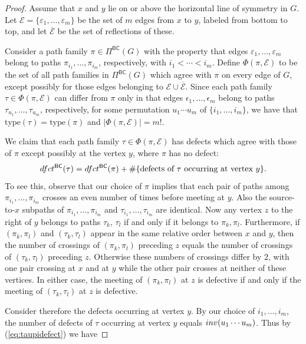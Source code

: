 \documentclass[10pt,a4paper]{amsart}
\newcommand{\PiBC}{\Pi^{\msfBC}}
\newcommand{\dfct}{\textsc{dfct}}
\newcommand{\inv}{\textsc{inv}}
\newcommand{\msfBC}{\mathsf{BC}}
\newcommand{\ol}[1]{\overline{#1}}
\newcommand{\type}{\mathrm{type}}
\begin{document}
\begin{proof}
Assume that $x$ and $y$ lie on or above the horizontal line of symmetry in $G$. Let $\mathcal E = \{\varepsilon_1,\dotsc, \varepsilon_m\}$ be the set of $m$ edges from $x$ to $y$, labeled from bottom to top, and let $\ol{\mathcal E}$ be the set of reflections of these.  

Consider a path family $\pi \in \PiBC(G)$ with the property that
edges $\varepsilon_1,\dotsc,\varepsilon_m$ belong to
paths $\pi_{i_1},\dotsc,\pi_{i_m}$, 
respectively, with $i_1 < \cdots < i_m$.
Define 
$\Phi(\pi,\mathcal E)$ to be the set of all path families in $\PiBC(G)$ which agree with $\pi$ on every edge of $G$, except possibly for those edges belonging to $\mathcal E \cup \ol{\mathcal E}$.
Since each path family $\tau \in \Phi(\pi,\mathcal E)$ 
can differ from $\pi$
only in that 
edges $\epsilon_1,\dotsc,\epsilon_m$ belong to 
paths $\tau_{u_1},\dotsc,\tau_{u_m}$, respectively,
for some permutation $u_1 \cdots u_m$ of $\{i_1,\dotsc,i_m\}$, we have that
$\type(\tau) = \type(\pi)$ and 
$|\Phi(\pi,\mathcal E)| = m!$.
  

We claim that each path family $\tau \in \Phi(\pi,\mathcal E)$ has defects which agree with those of $\pi$ except possibly at the vertex $y$, where $\pi$ has no defect:
   \begin{equation}\label{eq:taupidefect}
    \dfct^{\msfBC}(\tau) = \dfct^{\msfBC}(\pi) + \# \{ \text{defects of $\tau$ occurring at vertex $y$}\}.
\end{equation}
To see this, observe that our choice of $\pi$ implies that each pair of paths among $\pi_{i_1},\dotsc,\pi_{i_m}$ crosses an even number of times before meeting at $y$.  Also the source-to-$x$ subpaths of $\pi_{i_1},\dotsc,\pi_{i_m}$ and $\tau_{i_1},\dotsc,\tau_{i_m}$ are identical. Now any vertex $z$ to the right of $y$
belongs to
paths $\tau_k$, $\tau_l$ if and only if it belongs to $\pi_k, \pi_l$.
Furthermore, if $(\pi_k, \pi_l)$ and $(\tau_k,\tau_l)$ appear in the same relative order between $x$ and $y$, then the number of crossings of $(\pi_k, \pi_l)$ preceding $z$ equals the number of crossings of $(\tau_k, \tau_l)$ preceding $z$. Otherwise these numbers of crossings differ by $2$, with one pair crossing at $x$ and at $y$ while the other pair crosses at neither of these vertices.
In either case, the meeting of $(\pi_k, \pi_l)$ at $z$ is defective if and only if the meeting of $(\tau_k, \tau_l)$ at $z$ is defective.


Consider therefore the defects occurring at vertex $y$. By our choice of $i_1,\dotsc,i_m$, %
the number of defects of $\tau$ occurring at vertex $y$ equals $\inv(u_1 \cdots u_m)$. Thus by (\ref{eq:taupidefect}) we have 


\end{proof}
\end{document}

